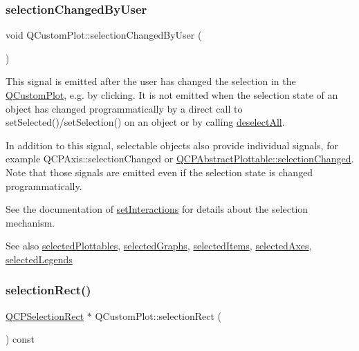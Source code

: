 \subsubsection{\texorpdfstring{selection\+Changed\+By\+User}{selectionChangedByUser}}
{\footnotesize\ttfamily void Q\+Custom\+Plot\+::selection\+Changed\+By\+User (\begin{DoxyParamCaption}{ }\end{DoxyParamCaption})\hspace{0.3cm}{\ttfamily [signal]}}

This signal is emitted after the user has changed the selection in the \hyperlink{class_q_custom_plot}{Q\+Custom\+Plot}, e.\+g. by clicking. It is not emitted when the selection state of an object has changed programmatically by a direct call to {\ttfamily set\+Selected()}/{\ttfamily set\+Selection()} on an object or by calling \hyperlink{class_q_custom_plot_a9d4808ab925b003054085246c92a257c}{deselect\+All}.

In addition to this signal, selectable objects also provide individual signals, for example Q\+C\+P\+Axis\+::selection\+Changed or \hyperlink{class_q_c_p_abstract_plottable_a3af66432b1dca93b28e00e78a8c7c1d9}{Q\+C\+P\+Abstract\+Plottable\+::selection\+Changed}. Note that those signals are emitted even if the selection state is changed programmatically.

See the documentation of \hyperlink{class_q_custom_plot_a5ee1e2f6ae27419deca53e75907c27e5}{set\+Interactions} for details about the selection mechanism.

\begin{DoxySeeAlso}{See also}
\hyperlink{class_q_custom_plot_a747faaab57c56891e901a1e97fa4359a}{selected\+Plottables}, \hyperlink{class_q_custom_plot_ad3547aded026d8a9ae6ef13a69080d06}{selected\+Graphs}, \hyperlink{class_q_custom_plot_afda487bcf2d6cf1a57173d82495e29ba}{selected\+Items}, \hyperlink{class_q_custom_plot_a7e6b07792b1cb2c31681596582d14dbe}{selected\+Axes}, \hyperlink{class_q_custom_plot_ac87624ddff1cbf4064781a8e8ae321c4}{selected\+Legends} 
\end{DoxySeeAlso}
\mbox{\label{class_q_custom_plot_ad7df2bcbba307e644db383b449e31efd}} 
\subsubsection{\texorpdfstring{selection\+Rect()}{selectionRect()}}
{\footnotesize\ttfamily \hyperlink{class_q_c_p_selection_rect}{Q\+C\+P\+Selection\+Rect} $\ast$ Q\+Custom\+Plot\+::selection\+Rect (\begin{DoxyParamCaption}{ }\end{DoxyParamCaption}) const\hspace{0.3cm}{\ttfamily [inline]}}

